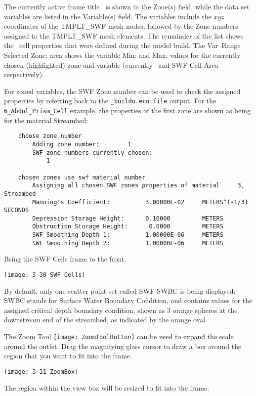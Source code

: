 The currently active frame title \swf\ is shown in the {\sf Zone(s)} field, while the data set variables are listed in the {\sf Variable(s)} field. The variables include the $xyz$ coordinates of the {\sf TMPLT\_SWF} mesh nodes, followed by the Zone numbers assigned to the {\sf TMPLT\_SWF} mesh elements.  The remainder of the list shows the \mfus\ cell properties that were defined during the model build. The {\sf Var--Range Selected Zone:} area shows the variable {\sf Min:} and {\sf Max:} values for the currently chosen (highlighted) zone and variable (currently \swf\ and {\sf SWF Cell Area} respectively).

For zoned variables, the {\sf SWF Zone} number can be used to check the assigned properties by referring back to the {\tt \_buildo.eco file} output.  For the {\tt 6\_Abdul\_Prism\_Cell} example, the properties of the first zone are shown as being for the material {\sf Streambed}:
\begin{verbatim}
    choose zone number
    	Adding zone number:        1
    	SWF zone numbers currently chosen:
    	    1

    chosen zones use swf material number
    	Assigning all chosen SWF zones properties of material     3, Streambed
    	Manning's Coefficient:          3.00000E-02     METERS^(-1/3)  SECONDS
    	Depression Storage Height:      0.10000         METERS
    	Obstruction Storage Height:      0.0000         METERS
    	SWF Smoothing Depth 1:          1.00000E-06     METERS
    	SWF Smoothing Depth 2:          1.00000E-06     METERS
\end{verbatim}

Bring the {\sf SWF Cells} frame to the front.

        \texttt{[image: 3\_30\_SWF\_Cells]}

By default, only one scatter point set called {\sf SWF SWBC} is being displayed. {\sf SWBC} stands for Surface Water Boundary Condition, and contains values for the assigned critical depth boundary condition, shown as 3 orange spheres at the downstream end  of the streambed, as indicated by the orange oval.

 The Zoom Tool \texttt{[image: ZoomToolButton]} can be used to expand the scale around the outlet.  Drag the magnifying glass cursor to draw a box around the region that you want to fit into the frame.

        \texttt{[image: 3\_31\_ZoomBox]}

The region within the view box will be resized to fit into the frame.

